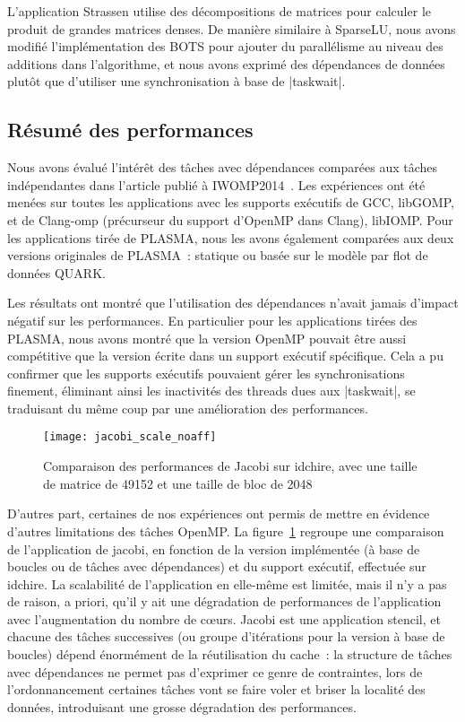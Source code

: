 L'application Strassen utilise des décompositions de matrices pour calculer le produit de grandes matrices denses.
De manière similaire à SparseLU, nous avons modifié l'implémentation des BOTS pour ajouter du parallélisme au niveau des additions dans l'algorithme, et nous avons exprimé des dépendances de données plutôt que d'utiliser une synchronisation à base de |taskwait|.

\subsection{Résumé des performances}

Nous avons évalué l'intérêt des tâches avec dépendances comparées aux tâches indépendantes dans l'article publié à IWOMP2014~\cite{Virouleau2014}.
Les expériences ont été menées sur toutes les applications avec les supports exécutifs de GCC, libGOMP, et de Clang-omp (précurseur du support d'OpenMP dans Clang), libIOMP.
Pour les applications tirée de PLASMA, nous les avons également comparées aux deux versions originales de PLASMA~: statique ou basée sur le modèle par flot de données QUARK.

Les résultats ont montré que l'utilisation des dépendances n'avait jamais d'impact négatif sur les performances.
En particulier pour les applications tirées des PLASMA, nous avons montré que la version OpenMP pouvait être aussi compétitive que la version écrite dans un support exécutif spécifique.
Cela a pu confirmer que les supports exécutifs pouvaient gérer les synchronisations finement, éliminant ainsi les inactivités des threads dues aux |taskwait|, se traduisant du même coup par une amélioration des performances.

\begin{figure}[ht]
  \centering
  \texttt{[image: jacobi\_scale\_noaff]}
  \caption{Comparaison des performances de Jacobi sur idchire, avec une taille de matrice de 49152 et une taille de bloc de 2048}\label{fig:contribs:openmp:kastors:jacobi-motiv}
\end{figure}

D'autres part, certaines de nos expériences ont permis de mettre en évidence d'autres limitations des tâches OpenMP.
La figure~\ref{fig:contribs:openmp:kastors:jacobi-motiv} regroupe une comparaison de l'application de jacobi, en fonction de la version implémentée (à base de boucles ou de tâches avec dépendances) et du support exécutif, effectuée sur idchire.
La scalabilité de l'application en elle-même est limitée, mais il n'y a pas de raison, a priori, qu'il y ait une dégradation de performances de l'application avec l'augmentation du nombre de cœurs.
Jacobi est une application stencil, et chacune des tâches successives (ou groupe d'itérations pour la version à base de boucles) dépend énormément de la réutilisation du cache~: la structure de tâches avec dépendances ne permet pas d'exprimer ce genre de contraintes, lors de l'ordonnancement certaines tâches vont se faire voler et briser la localité des données, introduisant une grosse dégradation des performances.

